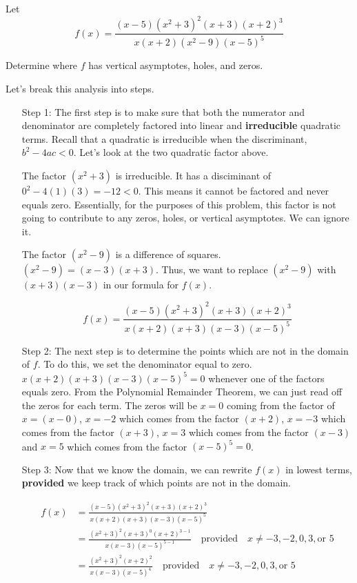 \documentclass{ximera}
\begin{document}
\begin{example}
 Let $$f(x)=\frac{(x-5)(x^2+3)^2(x+3)(x+2)^3}{x(x+2)(x^2-9)(x-5)^5}$$

Determine where $f$ has vertical asymptotes, holes, and zeros.
\begin{explanation}
Let's break this analysis into steps.

\begin{enumerate}

\item[Step 1:] The first step is to make sure that both the numerator and denominator are completely factored into linear and \textbf{irreducible} quadratic terms.  Recall that a quadratic is irreducible when the discriminant, $b^2-4ac<0$.  Let's look at the two quadratic factor above.  

The factor $(x^2+3)$ is irreducible.  It has a disciminant of $0^2-4(1)(3)=-12<0$.  This means it cannot be factored and never equals zero.  Essentially, for the purposes of this problem, this factor is not going to contribute to any zeros, holes, or vertical asymptotes.  We can ignore it.

The factor $(x^2-9)$ is a difference of squares.  $(x^2-9)=(x-3)(x+3)$.  Thus, we want to replace $(x^2-9)$ with $(x+3)(x-3)$ in our formula for $f(x)$.

$$f(x)=\frac{(x-5)(x^2+3)^2(x+3)(x+2)^3}{x(x+2)(x+3)(x-3)(x-5)^5}$$

\item[Step 2:] The next step is to determine the points which are not in the domain of $f$.  To do this, we set the denominator equal to zero.  $x(x+2)(x+3)(x-3)(x-5)^5=0$ whenever one of the factors equals zero.  From the Polynomial Remainder Theorem, we can just read off the zeros for each term.  The zeros will be $x=0$ coming from the factor of $x=(x-0)$, $x=-2$ which comes from the factor $(x+2)$, $x=-3$ which comes from the factor $(x+3)$, $x=3$ which comes from the factor $(x-3)$ and $x=5$ which comes from the factor $(x-5)^5=0$.

\item[Step 3:]  Now that we know the domain, we can rewrite $f(x)$ in lowest terms, \textbf{provided} we keep track of which points are not in the domain.

\begin{align*}
f(x)&=\frac{(x-5)(x^2+3)^2(x+3)(x+2)^3}{x(x+2)(x+3)(x-3)(x-5)^5}\\
&=\frac{(x^2+3)^2(x+3)^{0}(x+2)^{3-1}}{x(x-3)(x-5)^{5-1}}  \quad \text{provided} \quad  x \neq -3, -2, 0, 3, \text{or} \, \, 5 \\
&=\frac{(x^2+3)^2(x+2)^{2}}{x(x-3)(x-5)^{4}}  \quad \text{provided} \quad  x \neq -3, -2, 0, 3, \text{or} \, \, 5  \\
\end{align*}


\end{enumerate}
\end{explanation}
\end{example}
\end{document}
